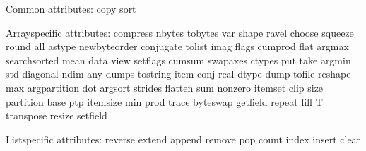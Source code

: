 \documentclass[letterpaper,10pt,english]{sphinxmanual}
\begin{document}
\begin{sphinxVerbatim}[commandchars=\\\{\}]
      \PYG{p}{[}\PYG{p}{]}  \PYG{p}{[}\PYG{p}{]}
        \PYG{p}{[}\PYG{p}{]}
  
   
  
\end{sphinxVerbatim}

\begin{sphinxVerbatim}[commandchars=\\\{\}]
Common attributes:
 copy sort

Array\PYGZhy{}specific attributes:
 compress nbytes tobytes var shape ravel choose squeeze round all astype newbyteorder conjugate tolist imag flags cumprod flat argmax searchsorted mean data view setflags cumsum swapaxes ctypes put take argmin std diagonal ndim any dumps tostring item conj real dtype dump tofile reshape max argpartition dot argsort strides flatten sum nonzero itemset clip size partition base ptp itemsize min prod trace byteswap getfield repeat fill T transpose resize setfield

List\PYGZhy{}specific attributes:
 reverse extend append remove pop count index insert clear
\end{sphinxVerbatim}
\end{document}
